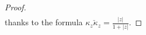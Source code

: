 \documentclass[a4papaer, titlepage]{book}
\begin{document}
\begin{proof}
\begin{align*}
  \end{align*}
  thanks to the formula $\kappa_z \check \kappa_z = \frac{|z|}{1+ |z|}$.


\end{proof}
\end{document}
